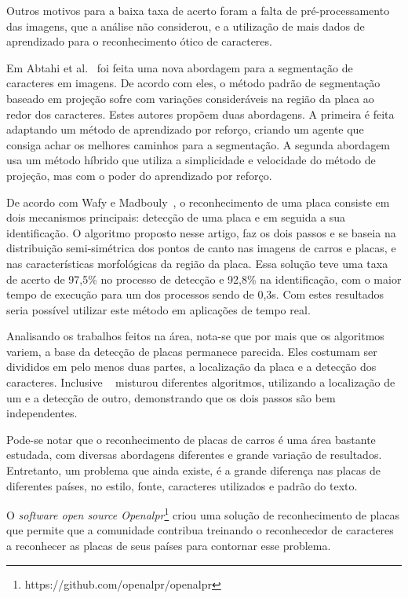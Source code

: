 Outros motivos para a baixa taxa de acerto foram a falta de pré-processamento
das imagens, que a análise não considerou, e a utilização de mais dados de
aprendizado para o reconhecimento ótico de caracteres.

Em Abtahi et al.~\cite{abtahi2015deep} foi feita uma nova abordagem para a
segmentação de caracteres em imagens. De acordo com eles, o método padrão de
segmentação baseado em projeção sofre com variações consideráveis na região da
placa ao redor dos caracteres. Estes autores propõem duas abordagens. A primeira
é feita adaptando um método de aprendizado por reforço, criando um agente que
consiga achar os melhores caminhos para a segmentação.  A segunda abordagem usa
um método híbrido que utiliza a simplicidade e velocidade do método de projeção,
mas com o poder do aprendizado por reforço.

De acordo com Wafy e Madbouly~\cite{wafy2016efficient}, o reconhecimento de uma
placa consiste em dois mecanismos principais: detecção de uma placa e em seguida
a sua identificação. O algoritmo proposto nesse artigo, faz os dois passos e se
baseia na distribuição semi-simétrica dos pontos de canto nas imagens de carros
e placas, e nas características morfológicas da região da placa. Essa solução
teve uma taxa de acerto de 97,5\% no processo de detecção e 92,8\% na
identificação, com o maior tempo de execução para um dos processos sendo de
0,3s. Com estes resultados seria possível utilizar este método em aplicações de
tempo real.

Analisando os trabalhos feitos na área, nota-se que por mais que os algoritmos variem,
a base da detecção de placas permanece parecida. Eles costumam ser divididos em pelo 
menos duas partes, a localização da placa e a detecção dos caracteres. Inclusive 
~\cite{ahmad2015automatic} misturou diferentes algoritmos, utilizando a localização 
de um e a detecção de outro, demonstrando que os dois passos são bem independentes.

Pode-se notar que o reconhecimento de placas de carros é uma área bastante estudada, 
com diversas abordagens diferentes e grande variação de resultados. Entretanto, 
um problema que ainda existe, é a grande diferença nas placas de diferentes países, 
no estilo, fonte, caracteres utilizados e padrão do texto. 

O \emph{software open source Openalpr}\footnote{https://github.com/openalpr/openalpr} 
criou uma solução de reconhecimento de placas que permite que a comunidade contribua 
treinando o reconhecedor de caracteres a reconhecer as placas de seus países para contornar 
esse problema.
